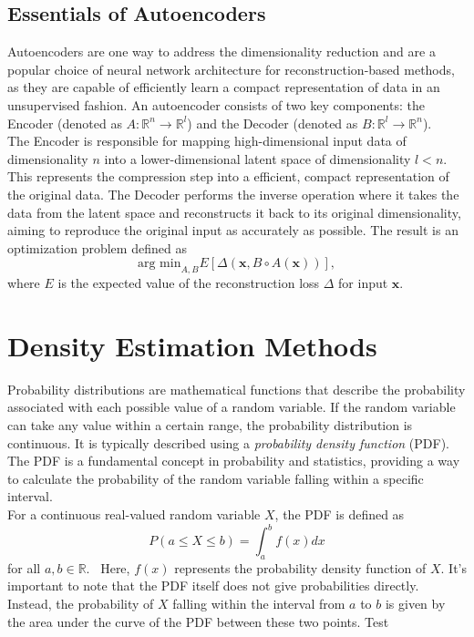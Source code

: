 \subsection{Essentials of Autoencoders}
Autoencoders are one way to address the dimensionality reduction and are a popular choice of neural network architecture for reconstruction-based methods, as they are capable of efficiently learn a compact representation of data in an unsupervised fashion. An autoencoder consists of two key components: the Encoder (denoted as $ A:\mathbb{R}^n \rightarrow{} \mathbb{R}^l$) and the Decoder (denoted as $ B:\mathbb{R}^l \rightarrow{} \mathbb{R}^n$).\\
The Encoder is responsible for mapping high-dimensional input data of dimensionality $ n $ into a lower-dimensional latent space of dimensionality $ l < n $. This represents the compression step into a efficient, compact representation of the original data. The Decoder performs the inverse operation where it takes the data from the latent space and reconstructs it back to its original dimensionality, aiming to reproduce the original input as accurately as possible. The result is an optimization problem defined as
\[ \text{arg min}_{A,B}E[\Delta (\mathbf{x}, B \circ A(\mathbf{x}))], \]
where $ E $ is the expected value of the reconstruction loss $ \Delta $ for input $ \mathbf{x} $.~\cite{bank2023autoencoders}


\section{Density Estimation Methods}
Probability distributions are mathematical functions that describe the probability associated with each possible value of a random variable. If the random variable can take any value within a certain range, the probability distribution is continuous. It is typically described using a \textit{probability density function} (PDF). The PDF is a fundamental concept in probability and statistics, providing a way to calculate the probability of the random variable falling within a specific interval. \\
For a continuous real-valued random variable $X$, the PDF is defined as
\[ P(a\leq X\leq b)=\int_a^bf(x)dx \]
for all $ a, b \in \mathbb{R}$.~\cite{grinstead2006probabilities} Here, $f(x)$ represents the probability density function of $X$. It's important to note that the PDF itself does not give probabilities directly. Instead, the probability of $X$ falling within the interval from $a$ to $b$ is given by the area under the curve of the PDF between these two points.
Test

